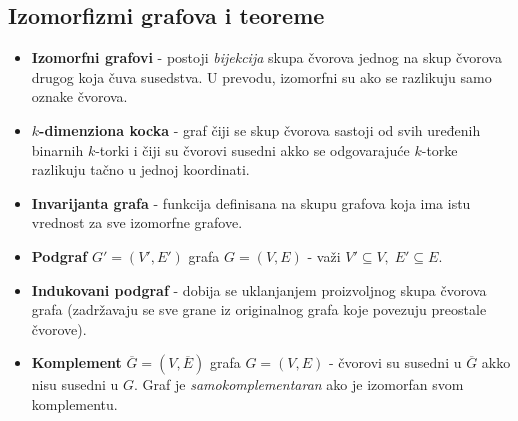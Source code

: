 \documentclass[a4paper,12pt]{article}
\numberwithin{algorithm}{section}
\theoremstyle{plain}
\theoremstyle{definition}
\theoremstyle{remark}
\begin{document}
\subsection{Izomorfizmi grafova i teoreme}
\begin{itemize}
    \item \textbf{Izomorfni grafovi} - postoji \textit{bijekcija} skupa čvorova jednog na skup čvorova drugog koja čuva susedstva. U prevodu, izomorfni su ako se razlikuju samo oznake čvorova.
    \item \textbf{$k$-dimenziona kocka} - graf čiji se skup čvorova sastoji od svih uređenih binarnih $k$-torki i čiji su čvorovi susedni akko se odgovarajuće $k$-torke razlikuju tačno u jednoj koordinati.
    \item \textbf{Invarijanta grafa} - funkcija definisana na skupu grafova koja ima istu vrednost za sve izomorfne grafove.
    \item \textbf{Podgraf} $G' = (V', E')$ grafa $G = (V, E)$ - važi $V' \subseteq V, \; E' \subseteq E$.
    \item \textbf{Indukovani podgraf} - dobija se uklanjanjem proizvoljnog skupa čvorova grafa (zadržavaju se sve grane iz originalnog grafa koje povezuju preostale čvorove).
    \item \textbf{Komplement} $\overline{G} = (V, \overline{E})$ grafa $G = (V, E)$ - čvorovi su susedni u $\overline{G}$ akko nisu susedni u $G$. Graf je \textit{samokomplementaran} ako je izomorfan svom komplementu.
\end{itemize}
\end{document}
